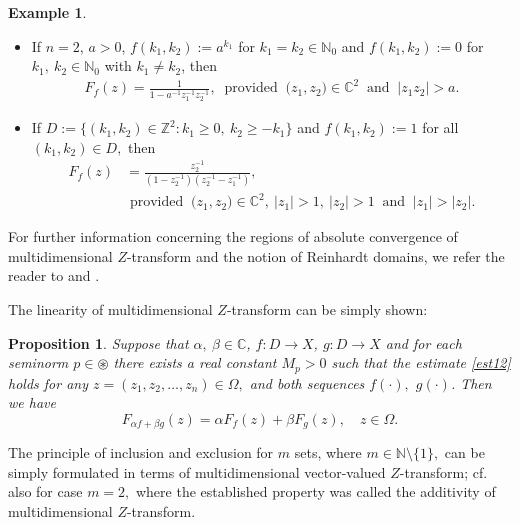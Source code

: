\documentclass{amsart}
\newtheorem{prop}[thm]{Proposition}
\theoremstyle{definition}
\newtheorem{example}[thm]{Example}
\theoremstyle{remark}
\numberwithin{equation}{section}
\begin{document}
\begin{example}\label{wasp}
\begin{itemize}
\item[(i)] If $n=2$, $a>0$, $f(k_{1},k_{2}):=a^{k_{1}}$ for $k_{1}=k_{2}\in {\mathbb N}_{0}$ and $f(k_{1},k_{2}):=0$ for $k_{1},\ k_{2}\in {\mathbb N}_{0}$ with $k_{1}\neq k_{2}$, then 
\begin{align*}
F_{f}(z)=\frac{1}{1-a^{-1}z_{1}^{-1}z_{2}^{-1}},\  \mbox{ provided }\ \bigl(z_{1},z_{2}\bigr)\in {\mathbb C}^{2}\ \mbox{ and }\ \bigl| z_{1}z_{2}\bigr|>a.
\end{align*}
\item[(ii)] If $D:=\{(k_{1},k_{2}) \in {\mathbb Z}^{2}: k_{1}\geq 0,\ k_{2}\geq -k_{1}\}$ and $f(k_{1},k_{2}):=1$ for all $(k_{1},k_{2})\in D,$ then
\begin{align*}
F_{f}(z)&=\frac{z_{2}^{-1}}{(1-z_{2}^{-1})(z_{2}^{-1}-z_{1}^{-1})},\\&  \mbox{ provided }\ \bigl(z_{1},z_{2}\bigr)\in {\mathbb C}^{2},\ \bigl| z_{1}\bigr|>1,\ \bigl| z_{2}\bigr|>1\ \mbox{ and }\ \bigl| z_{1}\bigr|>\bigl| z_{2}\bigr|.
\end{align*}
\end{itemize}
\end{example}

For further information concerning the regions of absolute convergence of multidimensional $Z$-transform and the notion of Reinhardt domains, we refer the reader to \cite[pp. 175--180]{dud} and \cite[Subsection 2.2]{gregor}. 

The linearity of multidimensional $Z$-transform can be simply shown: 

\begin{prop}\label{linear}
Suppose that $\alpha,\ \beta \in {\mathbb C}$, $f: D \rightarrow X$, $g: D \rightarrow X$ and for each seminorm $p\in \circledast$ there exists a real constant $M_{p}>0$ such that the estimate \eqref{est12} holds for any $z=(z_{1},z_{2},\ldots ,z_{n})\in \Omega ,$ and both sequences $f(\cdot),$ $g(\cdot)$. Then we have 
$$
F_{\alpha f+ \beta g} (z  )=\alpha F_{f} (z  )+\beta F_{g} (z ),\quad z\in \Omega.
$$
\end{prop}

The principle of inclusion and exclusion for $m$ sets, where $m\in {\mathbb N} \setminus \{1\},$ can be simply formulated in terms of multidimensional vector-valued $Z$-transform; cf. also \cite[Theorem 2.1.4]{gregor} for case $m=2,$ where the established property was called the additivity of multidimensional $Z$-transform.
\end{document}
